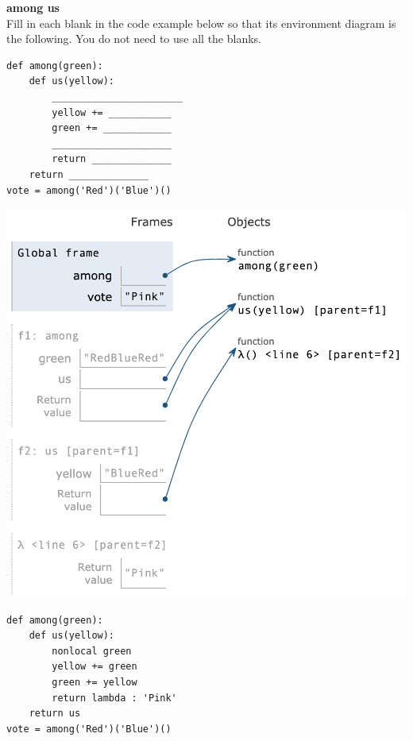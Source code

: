 \begin{blocksection}
\question
\textbf{among us}\\
Fill in each blank in the code example below so that its environment diagram is the following. You do not need to use all the blanks.

\begin{multicols}{2}
\begin{lstlisting}
def among(green):
    def us(yellow):
        _______________________
        yellow += ___________
        green += ____________
        _____________________
        return ______________
    return ______________
vote = among('Red')('Blue')()
\end{lstlisting}


\includegraphics[width=.5\textwidth]{amongus.png}
\end{multicols}

\begin{solution}[2in]
\begin{lstlisting}
def among(green):
    def us(yellow):
        nonlocal green
        yellow += green
        green += yellow
        return lambda : 'Pink'
    return us
vote = among('Red')('Blue')()
\end{lstlisting}
\end{solution}
\end{blocksection}

